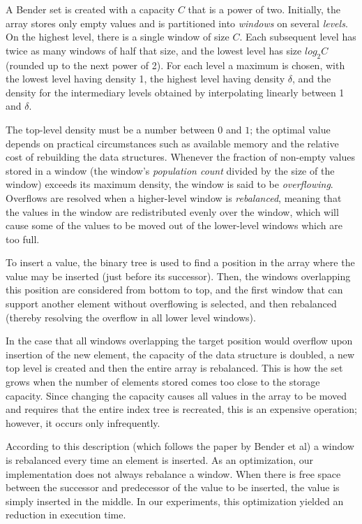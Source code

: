 \documentclass{acm_proc_article-sp}
\begin{document}
A Bender set is created with a capacity $C$ that is a power of two.
Initially, the array stores only empty values and is partitioned into
\emph{windows} on several \emph{levels}.
On the highest level, there is a single window of size $C$. Each subsequent level
has twice as many windows of half that size, and the lowest level has size
$log_2 C$ (rounded up to the next power of 2).
For each level a maximum  is chosen, with the lowest level having
density 1, the highest level having density $\delta$, and the density for
the intermediary levels obtained by interpolating linearly between 1 and
$\delta$.

The top-level density must be a number between $0$ and $1$; the optimal value
depends on practical circumstances such as available memory and the relative
cost of rebuilding the data structures.
Whenever the fraction of non-empty values stored in a window (the window's
\emph{population count} divided by the size of the window) exceeds its maximum
density, the window is said to be \emph{overflowing}.
Overflows are resolved when a higher-level window is \emph{rebalanced},
meaning that the values in the window are redistributed evenly over the window,
which will cause some of the values to be moved out of the lower-level windows
which are too full.

To insert a value, the binary tree is used to find a position in the array
where the value may be inserted (just before its successor). Then, the windows
overlapping this position are considered from bottom to top, and the first
window that can support another element without overflowing is selected, and
then rebalanced (thereby resolving the overflow in all lower level windows).

In the case that all windows overlapping the target position would overflow upon
insertion of the new element, the capacity of the data structure is doubled,
a new top level is created and then the entire array is rebalanced. This is how
the set grows when the number of elements stored comes too close to the storage
capacity. Since changing the capacity causes all values in the array to be moved
and requires that the entire index tree is recreated, this is an expensive
operation; however, it occurs only infrequently.

According to this description (which follows the paper by Bender et al) a window
is rebalanced every time an element is inserted. As an optimization, our
implementation does not always rebalance a window. When there is free space
between the successor and predecessor of the value to be inserted, the value
is simply inserted in the middle. In our experiments, this optimization
yielded an reduction in execution time.
\end{document}
